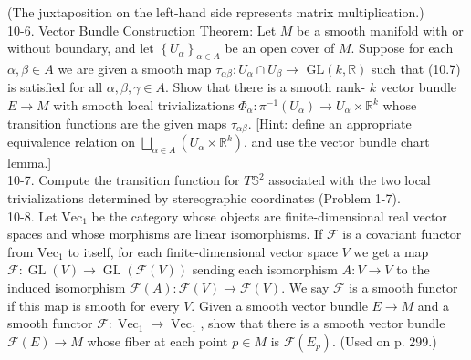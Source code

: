 \documentclass[10pt]{article}
\begin{document}
(The juxtaposition on the left-hand side represents matrix multiplication.)\\
10-6. Vector Bundle Construction Theorem: Let $M$ be a smooth manifold with or without boundary, and let $\left\{U_{\alpha}\right\}_{\alpha \in A}$ be an open cover of $M$. Suppose for each $\alpha, \beta \in A$ we are given a smooth map $\tau_{\alpha \beta}: U_{\alpha} \cap U_{\beta} \rightarrow$ $\mathrm{GL}(k, \mathbb{R})$ such that (10.7) is satisfied for all $\alpha, \beta, \gamma \in A$. Show that there is a smooth rank- $k$ vector bundle $E \rightarrow M$ with smooth local trivializations $\Phi_{\alpha}: \pi^{-1}\left(U_{\alpha}\right) \rightarrow U_{\alpha} \times \mathbb{R}^{k}$ whose transition functions are the given maps $\tau_{\alpha \beta}$. [Hint: define an appropriate equivalence relation on $\bigsqcup_{\alpha \in A}\left(U_{\alpha} \times \mathbb{R}^{k}\right)$, and use the vector bundle chart lemma.]\\
10-7. Compute the transition function for $T \mathbb{S}^{2}$ associated with the two local trivializations determined by stereographic coordinates (Problem 1-7).\\
10-8. Let $\mathrm{Vec}_{1}$ be the category whose objects are finite-dimensional real vector spaces and whose morphisms are linear isomorphisms. If $\mathscr{F}$ is a covariant functor from $\mathrm{Vec}_{1}$ to itself, for each finite-dimensional vector space $V$ we get a map $\mathscr{F}: \operatorname{GL}(V) \rightarrow \operatorname{GL}(\mathscr{F}(V))$ sending each isomorphism $A: V \rightarrow V$ to the induced isomorphism $\mathscr{F}(A): \mathscr{F}(V) \rightarrow \mathscr{F}(V)$. We say $\mathscr{F}$ is a smooth functor if this map is smooth for every $V$. Given a smooth vector bundle $E \rightarrow M$ and a smooth functor $\mathcal{F}: \operatorname{Vec}_{1} \rightarrow \operatorname{Vec}_{1}$, show that there is a smooth vector bundle $\mathscr{F}(E) \rightarrow M$ whose fiber at each point $p \in M$ is $\mathcal{F}\left(E_{p}\right)$. (Used on p. 299.)
\end{document}
